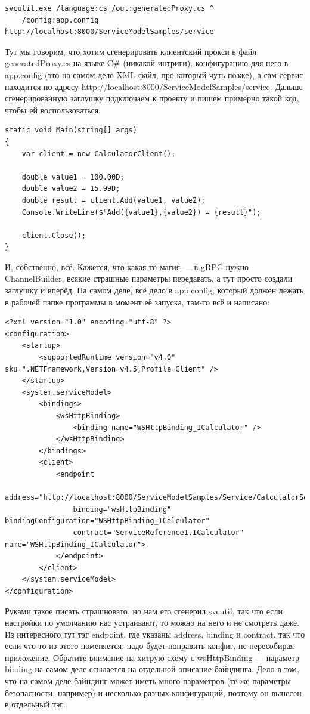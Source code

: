 \documentclass[a5paper]{article}
\begin{document}
\begin{verbatim}
svcutil.exe /language:cs /out:generatedProxy.cs ^
    /config:app.config http://localhost:8000/ServiceModelSamples/service
\end{verbatim}

Тут мы говорим, что хотим сгенерировать клиентский прокси в файл generatedProxy.cs на языке C\# (никакой интриги), конфигурацию для него в app.config (это на самом деле XML-файл, про который чуть позже), а сам сервис находится по адресу \url{http://localhost:8000/ServiceModelSamples/service}. Дальше сгенерированную заглушку подключаем к проекту и пишем примерно такой код, чтобы ей воспользоваться: 

\begin{verbatim}
static void Main(string[] args)
{
    var client = new CalculatorClient();

    double value1 = 100.00D;
    double value2 = 15.99D;
    double result = client.Add(value1, value2);
    Console.WriteLine($"Add({value1},{value2}) = {result}");

    client.Close();
}
\end{verbatim}

И, собственно, всё. Кажется, что какая-то магия --- в gRPC нужно ChannelBuilder, всякие страшные параметры передавать, а тут просто создали заглушку и вперёд. На самом деле, всё дело в app.config, который должен лежать в рабочей папке программы в момент её запуска, там-то всё и написано: 

\begin{verbatim}
<?xml version="1.0" encoding="utf-8" ?>  
<configuration>  
    <startup>   
        <supportedRuntime version="v4.0" sku=".NETFramework,Version=v4.5,Profile=Client" />  
    </startup>  
    <system.serviceModel>  
        <bindings>  
            <wsHttpBinding>  
                <binding name="WSHttpBinding_ICalculator" />  
            </wsHttpBinding>  
        </bindings>  
        <client>  
            <endpoint 
                address="http://localhost:8000/ServiceModelSamples/Service/CalculatorService"  
                binding="wsHttpBinding" bindingConfiguration="WSHttpBinding_ICalculator"  
                contract="ServiceReference1.ICalculator" name="WSHttpBinding_ICalculator">  
            </endpoint>  
        </client>  
    </system.serviceModel>  
</configuration>
\end{verbatim}

Руками такое писать страшновато, но нам его сгенерил svcutil, так что если настройки по умолчанию нас устраивают, то можно на него и не смотреть даже. Из интересного тут тэг endpoint, где указаны address, binding и contract, так что если что-то из этого поменяется, надо будет поправить конфиг, не пересобирая приложение. Обратите внимание на хитрую схему с wsHttpBinding --- параметр binding на самом деле ссылается на отдельной описание байндинга. Дело в том, что на самом деле байндинг может иметь много параметров (те же параметры безопасности, например) и несколько разных конфигураций, поэтому он вынесен в отдельный тэг.
\end{document}
